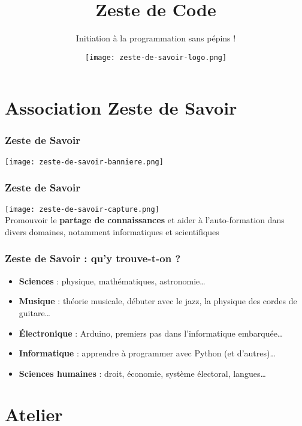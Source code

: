 \documentclass{beamer}
\title{Zeste de Code}
\subtitle{Initiation à la programmation sans pépins !}
\author{\texttt{[image: zeste-de-savoir-logo.png]}}
\date{}
\begin{document}
\begin{frame}
  \titlepage
\end{frame}

\section{Association Zeste de Savoir}

\begin{frame}
  \frametitle{Zeste de Savoir}
  \begin{center}
        \texttt{[image: zeste-de-savoir-banniere.png]}
    \end{center}
\end{frame}

\begin{frame}
    \frametitle{Zeste de Savoir}
    \begin{center}
        \texttt{[image: zeste-de-savoir-capture.png]}\\
        Promouvoir le \textbf{partage de connaissances} et aider à l’auto-formation dans divers domaines, notamment informatiques et scientifiques
    \end{center}
\end{frame}


\begin{frame}
    \frametitle{Zeste de Savoir : qu'y trouve-t-on ?}
    \begin{itemize}
        \item<1,6> \textbf{Sciences} : physique, mathématiques, astronomie…
        \item<2,6> \textbf{Musique} : théorie musicale, débuter avec le jazz, la physique des cordes de guitare…
        \item<3,6> \textbf{Électronique} : Arduino, premiers pas dans l'informatique embarquée…
        \item<4,6> \textbf{Informatique} : apprendre à programmer avec Python (et d'autres)…
        \item<5,6> \textbf{Sciences humaines} : droit, économie, système électoral, langues…
    \end{itemize}
\end{frame}


\section{Atelier}
\end{document}
